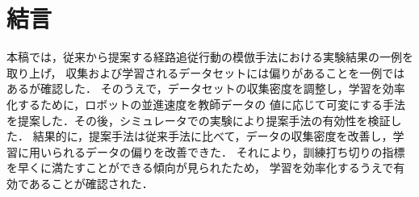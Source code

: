 \documentclass{jarticle}
\begin{document}
\section{結言}
本稿では，従来から提案する経路追従行動の模倣手法における実験結果の一例を取り上げ，
収集および学習されるデータセットには偏りがあることを一例ではあるが確認した．
そのうえで，データセットの収集密度を調整し，学習を効率化するために，ロボットの並進速度を教師データの
値に応じて可変にする手法を提案した．その後，シミュレータでの実験により提案手法の有効性を検証した．
結果的に，提案手法は従来手法に比べて，データの収集密度を改善し，学習に用いられるデータの偏りを改善できた．
それにより，訓練打ち切りの指標を早くに満たすことができる傾向が見られたため，
学習を効率化するうえで有効であることが確認された．\\

\vspace*{0.3zh}
\end{document}
